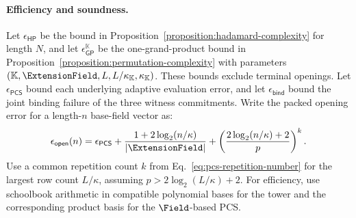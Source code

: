 \paragraph{Efficiency and soundness.}
Let \(\epsilon_{\mathsf{HP}}\) be the bound in
Proposition~\ref{proposition:hadamard-complexity} for length \(N\),
and let \(\epsilon_{\mathsf{GP}}^{\mathbb K}\) be the one-grand-product
bound in Proposition~\ref{proposition:permutation-complexity}
with parameters
\((\mathbb K,\ExtensionField,L,L/\kappa_{\mathbb K},
\kappa_{\mathbb K})\).
These bounds exclude terminal openings.
Let \(\epsilon_{\mathsf{PCS}}\) bound each underlying adaptive
evaluation error, and let \(\epsilon_{\mathsf{bind}}\) bound the
joint binding failure of the three witness commitments.
Write the packed opening error for a length-\(n\) base-field
vector as:
\begin{equation}
    \epsilon_{\mathsf{open}}(n)
       =\epsilon_{\mathsf{PCS}}
        +\frac{1+2\log_2(n/\kappa)}{|\ExtensionField|}
        +\left(\frac{2\log_2(n/\kappa)+2}{p}\right)^k.
\label{eq:together-opening-error}
\end{equation}
Use a common repetition count \(k\) from
Eq.~\eqref{eq:pcs-repetition-number} for the largest row count
\(L/\kappa\), assuming \(p>2\log_2(L/\kappa)+2\).
For efficiency, use schoolbook arithmetic in compatible polynomial
bases for the tower and the corresponding product basis for
the \(\Field\)-based PCS.

